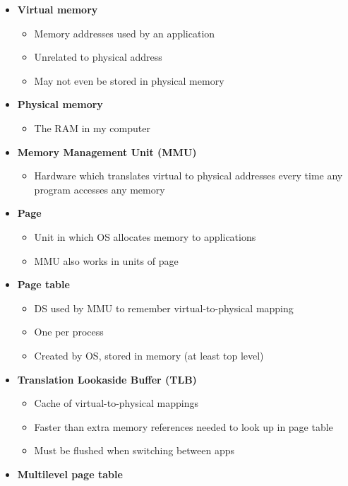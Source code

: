 \documentclass[a4paper]{article}
\begin{document}
\begin{itemize}
  \item {\bf Virtual memory}
    \begin{itemize}
      \item Memory addresses used by an application
      \item Unrelated to physical address
      \item May not even be stored in physical memory
    \end{itemize}
  \item {\bf Physical memory}
    \begin{itemize}
      \item The RAM in my computer
    \end{itemize}
  \item {\bf Memory Management Unit (MMU)}
    \begin{itemize}
      \item Hardware which translates virtual to physical addresses every time any program accesses any memory
    \end{itemize}
  \item {\bf Page}
    \begin{itemize}
      \item Unit in which OS allocates memory to applications
      \item MMU also works in units of page
    \end{itemize}
  \item {\bf Page table}
    \begin{itemize}
      \item DS used by MMU to remember virtual-to-physical mapping
      \item One per process
      \item Created by OS, stored in memory (at least top level)
    \end{itemize}
  \item {\bf Translation Lookaside Buffer (TLB) }
    \begin{itemize}
      \item Cache of virtual-to-physical mappings
      \item Faster than extra memory references needed to look up in page table
      \item Must be flushed when switching between apps
    \end{itemize}
  \item {\bf Multilevel page table }
    \begin{itemize}

\end{itemize}
\end{itemize}
\end{document}
